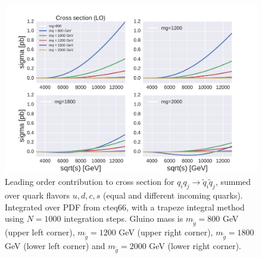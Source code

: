 \documentclass[11pt]{article}
\begin{document}
\begin{figure}[H]
\includegraphics[scale=0.8]{plots/cropped_sigma_varymg_all.pdf}
\caption{Leading order contribution to cross section for $q_iq_j \rightarrow \tilde{q}_i \tilde{q}_j$, summed over quark flavors $u,d,c,s$ (equal and different incoming quarks). Integrated over PDF from cteq66, with a trapeze integral method using $N=1000$ integration steps. Gluino mass is $m_{\tilde{g}}=800$ GeV (upper left corner), $m_{\tilde{g}}=1200$ GeV (upper right corner), $m_{\tilde{g}}=1800$ GeV (lower left corner) and $m_{\tilde{g}}=2000$ GeV (lower right corner).}
\label{fig:: results LO varying mg mq}
\end{figure}
\end{document}
